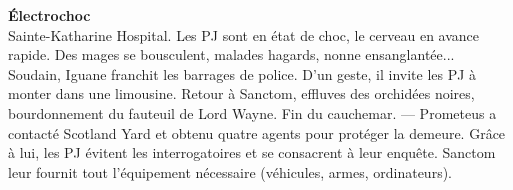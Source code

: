 \documentclass[11pt,twoside,a4paper]{book}
\begin{document}
\textbf{\large {\'E}lectrochoc}~\\

Sainte-Katharine Hospital. Les PJ sont en {\'e}tat de choc, le cerveau en avance rapide. Des mages se bousculent, malades hagards, nonne ensanglant{\'e}e... Soudain, Iguane franchit les barrages de police. D'un geste, il invite les PJ {\`a} monter dans une limousine. Retour {\`a} Sanctom, effluves des orchid{\'e}es noires, bourdonnement du fauteuil de Lord Wayne. Fin du cauchemar. --- Prometeus a contact{\'e} Scotland Yard et obtenu quatre agents pour prot{\'e}ger la demeure. Gr{\^a}ce {\`a} lui, les PJ {\'e}vitent les interrogatoires et se consacrent {\`a} leur enqu{\^e}te. Sanctom leur fournit tout l'{\'e}quipement n{\'e}cessaire (v{\'e}hicules, armes, ordinateurs).~\\

\end{document}
